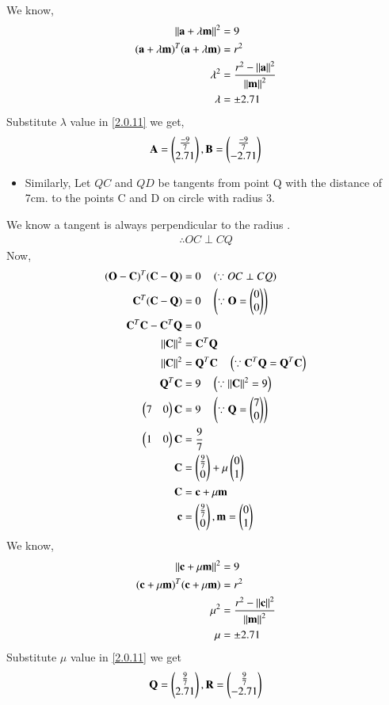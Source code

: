 \documentclass[journal,12pt,twocolumn]{IEEEtran}
\begin{document}
 We know,
\begin{align}
\left\lVert\mathbf{a}+\lambda\mathbf{m}\right\rVert^2&=9
\\
(\mathbf{a}+\lambda \mathbf{m})^T(\mathbf{a}+\lambda \mathbf{m})&=r^2
\\
\lambda^2&=\frac{r^2-\left\lVert\mathbf{a}\right\rVert^2}{\left\lVert\mathbf{m}\right\rVert^2}
\\
\lambda &= \pm2.71
\end{align}
Substitute $\lambda$  value in \eqref{2.0.11} we get,
\begin{align}
\mathbf{A}=\begin{pmatrix}\frac{-9}{7}\\2.71\end{pmatrix},
\mathbf{B}=\begin{pmatrix}\frac{-9}{7}\\-2.71\end{pmatrix}
\end{align}
\begin{itemize}
\item Similarly, Let $QC$ and $QD$  be tangents from point Q with the distance of 7cm. to the points C and D on circle with radius 3.
\end{itemize}
 We know a tangent is always perpendicular to the radius .
\begin{align}
\therefore OC \perp CQ
\end{align}
Now,
\begin{align}
(\mathbf{O}-\mathbf{C})^T (\mathbf{C}-\mathbf{Q}) &= 0 \quad \left(\because OC \perp CQ \right)
\\
\mathbf{C}^T(\mathbf{C}-\mathbf{Q}) &= 0 \quad \left(\because \mathbf{O}=\begin{pmatrix}0\\0\end{pmatrix}\right)
\\
\mathbf{C}^T \mathbf{C} - \mathbf{C}^T \mathbf{Q} &= 0  
\\
\left\lVert\mathbf{C}\right\rVert^2 &= \mathbf{C}^T \mathbf{Q}
\\
\left\lVert\mathbf{C}\right\rVert^2 &= \mathbf{Q}^T \mathbf{C}  \quad \left(\because \mathbf{C}^T \mathbf{Q} = \mathbf{Q}^T \mathbf{C}\right)
\\
\mathbf{Q}^T \mathbf{C} &= 9 \quad \left(\because \left\lVert\mathbf{C}\right\rVert^2 = 9\right)
\\
\begin{pmatrix}7&0\end{pmatrix} \mathbf{C} &= 9 \quad \left(\because \mathbf{Q} = \begin{pmatrix}7\\0\end{pmatrix} \right)
\\
\begin{pmatrix}1&0\end{pmatrix} \mathbf{C} &= \frac{9}{7}
\\
\mathbf{C} &= \begin{pmatrix}\frac{9}{7}\\0\end{pmatrix} + \mu \begin{pmatrix}0\\1\end{pmatrix} \label{2.0.11} 
\\
\mathbf{C}&=\mathbf{c}+\mu\mathbf{m} 
\\
\mathbf{c}&=\begin{pmatrix}\frac{9}{7}\\ 0\end{pmatrix},\mathbf{m}=\begin{pmatrix}0\\1\end{pmatrix}
\end{align}
We know,
\begin{align}
\left\lVert\mathbf{c}+\mu\mathbf{m}\right\rVert^2&=9
\\
(\mathbf{c}+\mu \mathbf{m})^T(\mathbf{c}+\mu \mathbf{m})&=r^2
\\
\mu^2&=\frac{r^2-\left\lVert\mathbf{c}\right\rVert^2}{\left\lVert\mathbf{m}\right\rVert^2}
\\
\mu &= \pm2.71
\end{align}
Substitute $\mu$  value in \eqref{2.0.11} we get
\begin{align}
\mathbf{Q}=\begin{pmatrix}\frac{9}{7}\\2.71\end{pmatrix},
\mathbf{R}=\begin{pmatrix}\frac{9}{7}\\-2.71\end{pmatrix}
\end{align}
\end{document}
